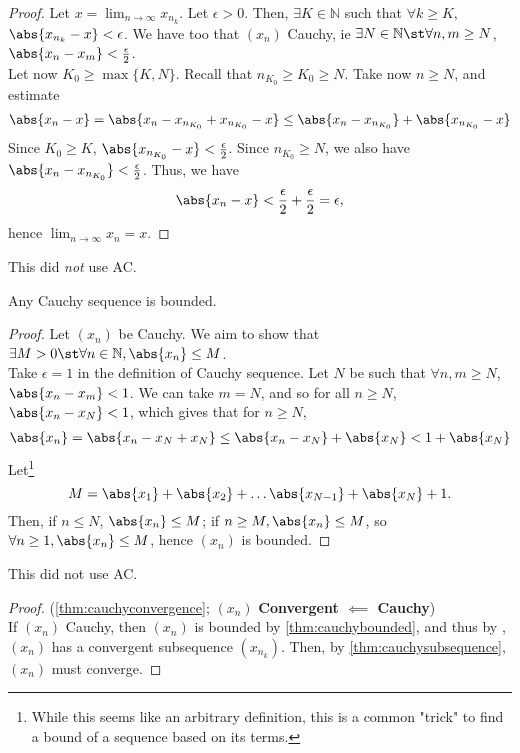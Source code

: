 \documentclass[12pt]{article}
\begin{document}
\begin{proof}
  Let $x = \lim_{n\to\infty} x_{n_k}$. Let $\epsilon > 0$. Then, $\exists K \in \mathbb{N}$ such that $\forall k \geq K$, $\abs{x_{n_k} - x} < \epsilon$. We have too that $(x_n)$ Cauchy, ie $\exists N \in \mathbb{N} \st \forall n,m \geq N$, $\abs{x_{n} - x_m} < \frac{\epsilon}{2}$. \\Let now $K_0 \geq \max \{K, N\}$. Recall that $n_{K_0} \geq K_0 \geq N$. Take now $n \geq N$, and estimate \begin{align*}
    \abs{x_n - x} = \abs{x_n - x_{n_{K_0}}+x_{n_{K_0}}-x} \leq \abs{x_n - x_{n_{K_0}}} + \abs{x_{n_{K_0}}-x}
  \end{align*}
  Since $K_0 \geq K$, $\abs{x_{n_{K_0}} - x} < \frac{\epsilon}{2}$. Since $n_{K_0} \geq N$, we also have $\abs{x_{n} - x_{n_{K_0}}} < \frac{\epsilon}{2}$. Thus, we have \[\abs{x_n - x} < \frac{\epsilon}{2} + \frac{\epsilon}{2} = \epsilon,\] hence $\lim_{n\to\infty} x_n = x$.
\end{proof}
\begin{remark}
  This did \textit{not} use AC.
\end{remark}
\begin{theorem}\label{thm:cauchybounded}
  Any Cauchy sequence is bounded.
\end{theorem}
\begin{proof}
  Let $(x_n)$ be Cauchy. We aim to show that $\exists M > 0 \st \forall n \in \mathbb{N}, \abs{x_n} \leq M$.\\
  Take $\epsilon = 1$ in the definition of Cauchy sequence. Let $N$ be such that $\forall n,m \geq N$, $\abs{x_n - x_m} < 1$. We can take $m = N$, and so for all $n \geq N$, $\abs{x_n - x_{N}} < 1$, which gives that for $n \geq N$,
  \begin{align*}
    \abs{x_n} = \abs{x_{n} - x_{N} + x_N} \leq \abs{x_n- x_N} + \abs{x_N} < 1 + \abs{x_N}
  \end{align*}
  Let\footnote{While this seems like an arbitrary definition, this is a common "trick" to find a bound of a sequence based on its terms.} $$M = \abs{x_1} + \abs{x_2} + \dots \abs{x_{N-1}} + \abs{x_N} + 1.$$ Then, if $n \leq N$, $\abs{x_n} \leq M$; if $n \geq M, \abs{x_n} \leq M$, so $\forall n \geq 1, \abs{x_n} \leq M$, hence $(x_n)$ is bounded.
\end{proof}
\begin{remark}
  This did not use AC.
\end{remark}
\begin{proof}(\cref{thm:cauchyconvergence}; $(x_n)$\textbf{ Convergent $\impliedby$ Cauchy}) \\If $(x_n)$ Cauchy, then $(x_n)$ is bounded by \cref{thm:cauchybounded}, and thus by , $(x_n)$ has a convergent subsequence $(x_{n_k})$. Then, by \cref{thm:cauchysubsequence}, $(x_n)$ must converge.
\end{proof}\label{proof:cauchyconvergenceimpliedby}
\end{document}
